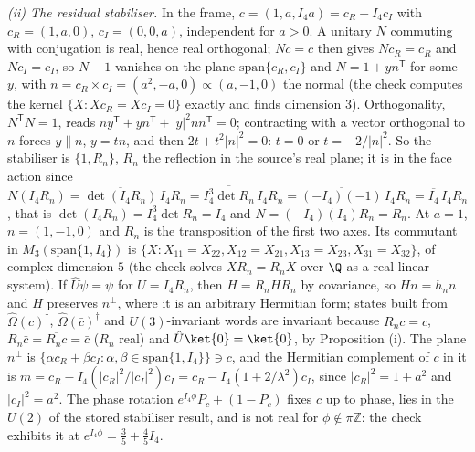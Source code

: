 \emph{(ii) The residual stabiliser.} In the frame, $c = (1, a, I_4 a) = c_{R} + I_4 c_{I}$ with $c_{R} = (1, a, 0)$, $c_{I} = (0, 0, a)$, independent for $a > 0$. A unitary $N$ commuting with conjugation is real, hence real orthogonal; $Nc = c$ then gives $Nc_{R} = c_{R}$ and $Nc_{I} = c_{I}$, so $N - 1$ vanishes on the plane $\mathrm{span}\{c_{R}, c_{I}\}$ and $N = 1 + yn^{\mathsf T}$ for some $y$, with $n = c_{R}\times c_{I} = (a^{2}, -a, 0) \propto (a, -1, 0)$ the normal (the check computes the kernel $\{X : Xc_{R} = Xc_{I} = 0\}$ exactly and finds dimension $3$). Orthogonality, $N^{\mathsf T}N = 1$, reads $ny^{\mathsf T} + yn^{\mathsf T} + |y|^{2}nn^{\mathsf T} = 0$; contracting with a vector orthogonal to $n$ forces $y \parallel n$, $y = tn$, and then $2t + t^{2}|n|^{2} = 0$: $t = 0$ or $t = -2/|n|^{2}$. So the stabiliser is $\{1, R_{n}\}$, $R_{n}$ the reflection in the source's real plane; it is in the face action since $N(I_4 R_{n}) = \overline{\det(I_4 R_{n})}\,I_4 R_{n} = \overline{I_4^{3}\det R_{n}}\,I_4 R_{n} = \overline{(-I_4)(-1)}\,I_4 R_{n} = \overline{I_4}\,I_4 R_{n}$, that is $\det(I_4 R_{n}) = I_4^{3}\det R_{n} = I_4$ and $N = (-I_4)(I_4)R_{n} = R_{n}$. At $a = 1$, $n = (1, -1, 0)$ and $R_{n}$ is the transposition of the first two axes. Its commutant in $M_{3}(\mathrm{span}\{1, I_4\})$ is $\{X : X_{11} = X_{22}, X_{12} = X_{21}, X_{13} = X_{23}, X_{31} = X_{32}\}$, of complex dimension $5$ (the check solves $XR_{n} = R_{n}X$ over $\Q$ as a real linear system). If $\hat{U}\psi = \psi$ for $U = I_4 R_{n}$, then $H = R_{n}HR_{n}$ by covariance, so $Hn = h_{n}n$ and $H$ preserves $n^{\perp}$, where it is an arbitrary Hermitian form; states built from $\hat\Omega(c)^{\dagger}$, $\hat\Omega(\bar{c})^{\dagger}$ and $U(3)$-invariant words are invariant because $R_{n}c = c$, $R_{n}\bar{c} = \overline{R_{n}c} = \bar{c}$ ($R_{n}$ real) and $\hat{U}\ket{0} = \ket{0}$, by Proposition (i). The plane $n^{\perp}$ is $\{\alpha c_{R} + \beta c_{I} : \alpha, \beta \in \mathrm{span}\{1, I_4\}\} \ni c$, and the Hermitian complement of $c$ in it is $m = c_{R} - I_4(|c_{R}|^{2}/|c_{I}|^{2})c_{I} = c_{R} - I_4(1 + 2/\lambda^{2})c_{I}$, since $|c_{R}|^{2} = 1 + a^{2}$ and $|c_{I}|^{2} = a^{2}$. The phase rotation $e^{I_4\phi}P_{c} + (1 - P_{c})$ fixes $c$ up to phase, lies in the $U(2)$ of the stored stabiliser result, and is not real for $\phi \notin \pi\mathbb{Z}$: the check exhibits it at $e^{I_4\phi} = \tfrac35 + \tfrac45 I_4$.

